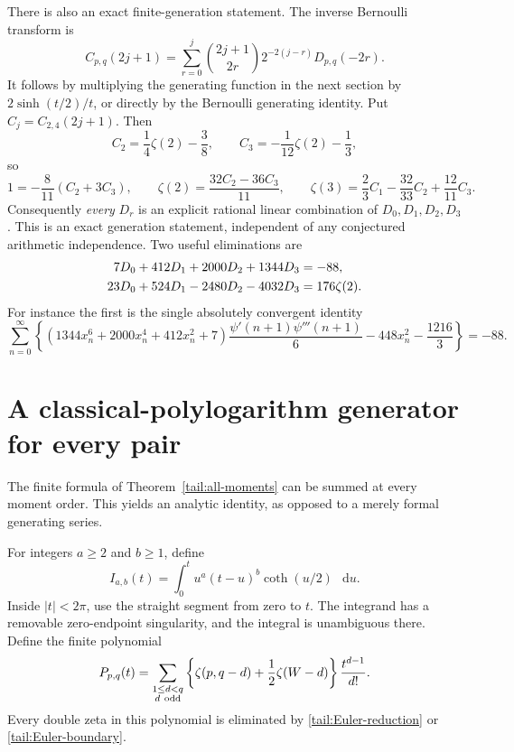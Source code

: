 \documentclass[11pt,a4paper]{article}
\numberwithin{equation}{section}
\theoremstyle{definition}
\theoremstyle{remark}
\newcommand{\dd}{\mathop{}\!\mathrm{d}}
\begin{document}
There is also an exact finite-generation statement. The inverse
Bernoulli transform is
\begin{equation}\label{tail:inverse-transform}
 C_{p,q}(2j+1)=\sum_{r=0}^{j}
          \binom{2j+1}{2r}2^{-2(j-r)}D_{p,q}(-2r).
\end{equation}
It follows by multiplying the generating function in the next
section by \(2\sinh(t/2)/t\), or directly by the Bernoulli
generating identity. Put \(C_j=C_{2,4}(2j+1)\). Then
\[
 C_2=\frac14\zeta(2)-\frac38,
 \qquad C_3=-\frac1{12}\zeta(2)-\frac13,
\]
so
\[
 1=-\frac8{11}(C_2+3C_3),\qquad
 \zeta(2)=\frac{32C_2-36C_3}{11},\qquad
 \zeta(3)=\frac23C_1-\frac{32}{33}C_2+\frac{12}{11}C_3.
\]
Consequently \emph{every} \(D_r\) is an explicit rational linear
combination of \(D_0,D_1,D_2,D_3\). This is an exact generation
statement, independent of any conjectured arithmetic independence.
Two useful eliminations are
\begin{align}\label{tail:24-eliminations}
 7D_0+412D_1+2000D_2+1344D_3&=-88,\notag\\
 23D_0+524D_1-2480D_2-4032D_3&=176\zeta(2).
\end{align}
For instance the first is the single absolutely convergent identity
\begin{equation}\label{tail:rational-polygamma}
 \sum_{n=0}^{\infty}
 \left\{
 (1344x_n^6+2000x_n^4+412x_n^2+7)
       \frac{\psi'(n+1)\psi'''(n+1)}6
       -448x_n^2-\frac{1216}{3}
 \right\}=-88.
\end{equation}




\section{A classical-polylogarithm generator for every pair}
\label{tail:generator-section}

The finite formula of Theorem~\ref{tail:all-moments} can be summed
at every moment order. This yields an analytic identity, as opposed
to a merely formal generating series.

For integers \(a\ge2\) and \(b\ge1\), define
\begin{equation}\label{tail:I}
 I_{a,b}(t)=\int_0^t u^a(t-u)^b\coth(u/2)\,\dd u.
\end{equation}
Inside \(|t|<2\pi\), use the straight segment from zero to \(t\).
The integrand has a removable zero-endpoint singularity, and the
integral is unambiguous there. Define the finite polynomial
\begin{equation}\label{tail:P}
 P_{p,q}(t)=\sum_{\substack{1\le d<q\\d\ {
 \rm odd}}}
 \left\{\zeta(p,q-d)+\frac12\zeta(W-d)\right\}
                        \frac{t^{d-1}}{d!}.
\end{equation}
Every double zeta in this polynomial is eliminated by
\eqref{tail:Euler-reduction} or \eqref{tail:Euler-boundary}.
\end{document}
